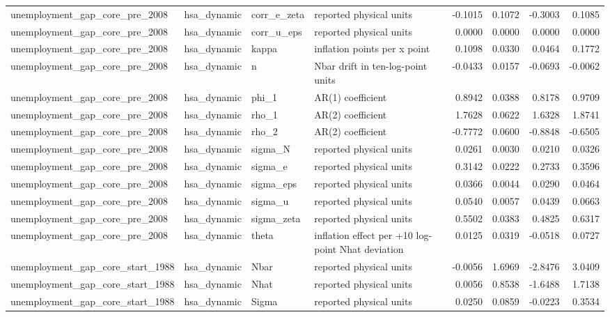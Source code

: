 \begin{tabular}{llllrrrr}
unemployment\_gap\_core\_pre\_2008 & hsa\_dynamic & corr\_e\_zeta & reported physical units & -0.1015 & 0.1072 & -0.3003 & 0.1085 \\
unemployment\_gap\_core\_pre\_2008 & hsa\_dynamic & corr\_u\_eps & reported physical units & 0.0000 & 0.0000 & 0.0000 & 0.0000 \\
unemployment\_gap\_core\_pre\_2008 & hsa\_dynamic & kappa & inflation points per x point & 0.1098 & 0.0330 & 0.0464 & 0.1772 \\
unemployment\_gap\_core\_pre\_2008 & hsa\_dynamic & n & Nbar drift in ten-log-point units & -0.0433 & 0.0157 & -0.0693 & -0.0062 \\
unemployment\_gap\_core\_pre\_2008 & hsa\_dynamic & phi\_1 & AR(1) coefficient & 0.8942 & 0.0388 & 0.8178 & 0.9709 \\
unemployment\_gap\_core\_pre\_2008 & hsa\_dynamic & rho\_1 & AR(2) coefficient & 1.7628 & 0.0622 & 1.6328 & 1.8741 \\
unemployment\_gap\_core\_pre\_2008 & hsa\_dynamic & rho\_2 & AR(2) coefficient & -0.7772 & 0.0600 & -0.8848 & -0.6505 \\
unemployment\_gap\_core\_pre\_2008 & hsa\_dynamic & sigma\_N & reported physical units & 0.0261 & 0.0030 & 0.0210 & 0.0326 \\
unemployment\_gap\_core\_pre\_2008 & hsa\_dynamic & sigma\_e & reported physical units & 0.3142 & 0.0222 & 0.2733 & 0.3596 \\
unemployment\_gap\_core\_pre\_2008 & hsa\_dynamic & sigma\_eps & reported physical units & 0.0366 & 0.0044 & 0.0290 & 0.0464 \\
unemployment\_gap\_core\_pre\_2008 & hsa\_dynamic & sigma\_u & reported physical units & 0.0540 & 0.0057 & 0.0439 & 0.0663 \\
unemployment\_gap\_core\_pre\_2008 & hsa\_dynamic & sigma\_zeta & reported physical units & 0.5502 & 0.0383 & 0.4825 & 0.6317 \\
unemployment\_gap\_core\_pre\_2008 & hsa\_dynamic & theta & inflation effect per +10 log-point Nhat deviation & 0.0125 & 0.0319 & -0.0518 & 0.0727 \\
unemployment\_gap\_core\_start\_1988 & hsa\_dynamic & Nbar & reported physical units & -0.0056 & 1.6969 & -2.8476 & 3.0409 \\
unemployment\_gap\_core\_start\_1988 & hsa\_dynamic & Nhat & reported physical units & 0.0056 & 0.8538 & -1.6488 & 1.7138 \\
unemployment\_gap\_core\_start\_1988 & hsa\_dynamic & Sigma & reported physical units & 0.0250 & 0.0859 & -0.0223 & 0.3534 \\

\end{tabular}
